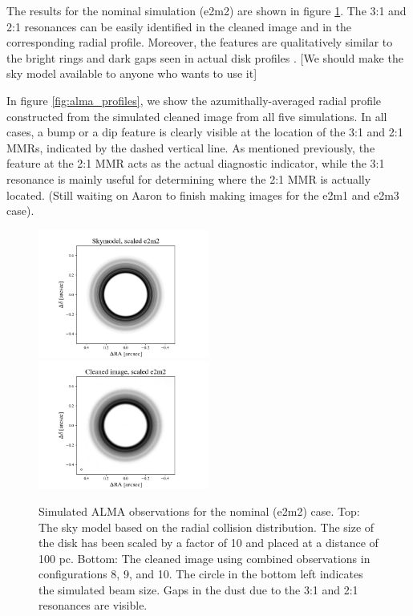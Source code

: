 \documentclass[twocolumn]{aastex63}
\begin{document}
The results for the nominal simulation (e2m2) are shown in figure \ref{fig:alma_sim_obs}. The 3:1 and 2:1 resonances can be easily identified in the 
cleaned image and in the corresponding radial profile.  Moreover, the features are qualitatively similar to the bright rings and dark gaps seen in actual 
disk profiles \citep{2015ApJ...808L...3A}. [We should make the sky model available to anyone who wants to use it]

In figure \ref{fig:alma_profiles}, we show the azumithally-averaged radial profile constructed from the simulated cleaned image from all five 
simulations. In all cases, a bump or a dip feature is clearly visible at the location of the 3:1 and 2:1 MMRs, indicated by the dashed vertical line. 
As mentioned previously, the feature at the 2:1 MMR acts as the actual diagnostic indicator, while the 3:1 resonance is mainly useful for 
determining where the 2:1 MMR is actually located. (Still waiting on Aaron to finish making images for the e2m1 and e2m3 case).

\begin{figure}
\begin{center}
    \includegraphics[width=0.5\textwidth]{alma/skymodel_e2m2.png}
    \includegraphics[width=0.5\textwidth]{alma/xy_e2m2.png}
    \caption{Simulated ALMA observations for the nominal (e2m2) case.  Top: The sky model based on the radial collision distribution. The size of the disk has been scaled by a factor of 10 and placed at  a distance of 100 pc. Bottom: The cleaned image using combined observations in configurations 8, 9, and 10. The circle in the bottom left indicates the simulated beam size. Gaps in the dust due to the 3:1 and 2:1 resonances are visible. \label{fig:alma_sim_obs}}
\end{center}
\end{figure}
\end{document}

